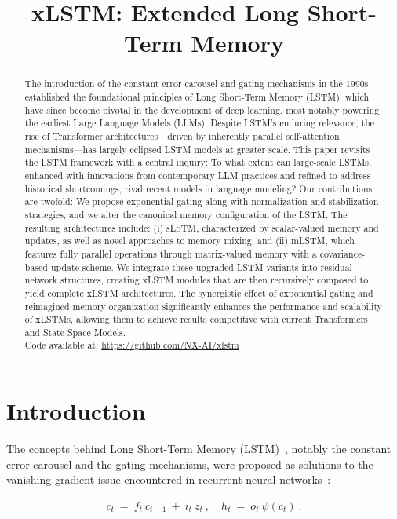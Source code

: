\title{xLSTM: Extended Long Short-Term Memory}

\begin{abstract}
The introduction of the constant error carousel and gating mechanisms in the 1990s established the foundational principles of Long Short-Term Memory (LSTM), which have since become pivotal in the development of deep learning, most notably powering the earliest Large Language Models (LLMs). Despite LSTM’s enduring relevance, the rise of Transformer architectures—driven by inherently parallel self-attention mechanisms—has largely eclipsed LSTM models at greater scale. This paper revisits the LSTM framework with a central inquiry: To what extent can large-scale LSTMs, enhanced with innovations from contemporary LLM practices and refined to address historical shortcomings, rival recent models in language modeling? Our contributions are twofold: We propose exponential gating along with normalization and stabilization strategies, and we alter the canonical memory configuration of the LSTM. The resulting architectures include: (i) sLSTM, characterized by scalar-valued memory and updates, as well as novel approaches to memory mixing, and (ii) mLSTM, which features fully parallel operations through matrix-valued memory with a covariance-based update scheme. We integrate these upgraded LSTM variants into residual network structures, creating xLSTM modules that are then recursively composed to yield complete xLSTM architectures. The synergistic effect of exponential gating and reimagined memory organization significantly enhances the performance and scalability of xLSTMs, allowing them to achieve results competitive with current Transformers and State Space Models.\\
Code available at: \url{https://github.com/NX-AI/xlstm}
\end{abstract}

\section{Introduction}
\label{sec:intro}

The concepts behind Long Short-Term Memory (LSTM)~\citep{Hochreiter:91,Hochreiter:97nips,Hochreiter:97}, notably the constant error carousel and the gating mechanisms, were proposed as solutions to the vanishing gradient issue encountered in recurrent neural networks~\citep{Hochreiter:91,Hochreiter:00book}:

\begin{align}
\label{eq:lstm_idea}
  c_t \ = \ f_t \ c_{t-1} \ + \ 
          i_t \  z_t \ , \quad  
          h_t \ = \ o_t \ \psi({c_t}) \ . 
\end{align}

